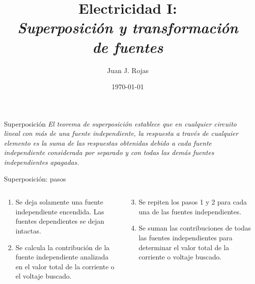 \documentclass[aspectratio=169]{beamer}
\title{Electricidad I: \\ \emph{Superposición y transformación} \\ \emph{de fuentes}}
\author{
    Juan J. Rojas
}
\institute{Instituto Tecnológico de Costa Rica}
\date{\today}
\begin{document}

\maketitle

\begin{frame}{Superposición}
    \emph{El teorema de superposición establece que en cualquier circuito lineal con más de una fuente independiente, la respuesta a través de cualquier elemento es la suma de las respuestas obtenidas debido a cada fuente independiente considerada por separado y con todas las demás fuentes independientes apagadas.}
\end{frame}

\begin{frame}{Superposición: pasos}
    \begin{columns}[onlytextwidth,T]
    \begin{column}{0.5\textwidth}
        \begin{enumerate}
            \item<+-> Se deja solamente una fuente independiente encendida. Las fuentes dependientes se dejan intactas.
            \item<+-> Se calcula la contribución de la fuente independiente analizada en el valor total de la corriente o el voltaje buscado.
        \end{enumerate}
    \end{column}
    \begin{column}{0.5\textwidth}
        \begin{enumerate}
        \setcounter{enumi}{2}
            \item<+-> Se repiten los pasos 1 y 2 para cada una de las fuentes independientes.
            \item<+-> Se suman las contribuciones de todas las fuentes independientes para determinar el valor total de la corriente o voltaje buscado. 
        \end{enumerate}
    \end{column}
    \end{columns}
\end{frame}
\end{document}

